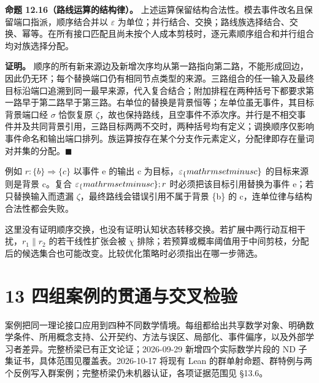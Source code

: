 \documentclass[UTF8,a4paper,zihao=-4,fontset=windows,openany]{ctexbook}
\newcommand{\mcsorigin}[1]{\par\noindent{\small\color{black!55}#1}\par\addvspace{0.8em}}
\def\mathrm#1{#1}%
\begin{document}
\textbf{命题 12.16（路线运算的结构律）。} 上述运算保留结构合法性。模去事件改名且保留端口指派，顺序结合并以 \(\varepsilon\) 为单位；并行结合、交换；路线族选择结合、交换、幂等。在所有接口匹配且尚未按个人成本剪枝时，逐元素顺序组合和并行组合均对族选择分配。

\textbf{证明。} 顺序的所有新来源边及新增次序均从第一路指向第二路，不能形成回边，因此仍无环；每个替换端口仍有相同节点类型的来源。三路组合的任一输入及最终目标沿端口追溯到同一最早来源，代入复合结合；附加排程在两种括号下都要求第一路早于第二路早于第三路。右单位的替换是背景恒等；左单位虽无事件，其目标背景端口经 \(\sigma\) 恰恢复原 \(\zeta\)，故也保持路线，且空事件不添次序。并行是不相交事件并及共同背景引用，三路目标两两不交时，两种括号均有定义；调换顺序仅影响事件命名和输出端口排列。族运算按存在某个分支作元素定义，分配律即存在量词对并集的分配。\(\blacksquare\)

例如 \(r:\{b\}\Rightarrow\{c\}\) 以事件 e 的输出 c 为目标，\(\varepsilon_\{\\mathrm{setminus} {c\}}\) 的目标来源则是背景 c。复合 \(\varepsilon_\{\\mathrm{setminus} {c\}};r\) 时必须把该目标引用替换为事件 e；若只替换输入而遗漏 \(\zeta\)，最终路线会错误引用不属于背景 \{b\} 的 c，连单位律与结构合法性都会失败。

这里没有证明顺序交换，也没有证明认知状态转移交换。若扩展中两行动互相干扰，\(r_{1}\parallel r_{2}\) 的若干线性扩张会被 \(\chi\) 排除；若预算或概率阈值用于中间剪枝，分配后的候选集合也可能改变。比较优化策略时必须指出在哪一步筛选。

\clearpage\chapter{13 四组案例的贯通与交叉检验}
\label{mcs-source-15}
\mcsorigin{原章节：13-贯通案例.md}
案例把同一理论接口应用到四种不同数学情境。每组都给出共享数学对象、明确数学条件、所用概念支持、公开契约、方法与误区、局部化、事件偏序，以及外部学习者差异。完整桥梁已有正文论证；2026-09-29 新增四个实际数学片段的 ND 子集证书，具体范围见覆盖表。2026-10-17 将现有 Lean 的群单射命题、群特例与两个反例写入群案例；完整桥梁仍未机器认证，各项证据范围见 §13.6。
\end{document}
